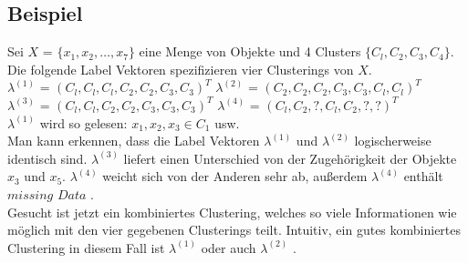\documentclass[runningheads]{llncs}
\begin{document}
\subsection{Beispiel}
Sei $X$ = $\{x_1, x_2, \ldots, x_7\}$ eine Menge von Objekte und 4 Clusters $\{C_{l}, C_{2}, C_{3}, C_{4}\}$. Die folgende Label Vektoren spezifizieren  vier Clusterings von $X$.\\[4pt]
$\lambda^{(1)}$ = $(C_{l}, C_{l}, C_{l}, C_{2}, C_{2}, C_{3}, C_{3})^{T}$ \qquad		
$\lambda^{(2)}$ = $(C_{2}, C_{2}, C_{2}, C_{3}, C_{3}, C_{l}, C_{l})^{T}$ \\
$\lambda^{(3)}$ = $(C_{l}, C_{l}, C_{2}, C_{2}, C_{3}, C_{3}, C_{3})^{T}$	\qquad
$\lambda^{(4)}$ = $(C_{l}, C_{2}, ?, C_{l}, C_{2}, ?, ?)^{T}$ \\
$\lambda^{(1)}$ wird so gelesen: $x_1, x_2, x_3 \in C_{1}$ usw.\\
Man kann erkennen, dass die Label Vektoren $\lambda^{(1)}$ und $\lambda^{(2)}$ logischerweise identisch sind. $\lambda^{(3)}$ liefert einen Unterschied von der Zugehörigkeit der Objekte $x_3$ und $x_5$. $\lambda^{(4)}$ weicht sich von der Anderen sehr ab, außerdem $\lambda^{(4)}$ enthält $missing$ $Data$ \cite{strehl2002cluster}.\\
Gesucht ist jetzt ein kombiniertes Clustering, welches so viele Informationen wie möglich mit den vier gegebenen Clusterings teilt. Intuitiv, ein gutes kombiniertes Clustering in diesem Fall ist  $\lambda^{(1)}$ oder auch $\lambda^{(2)}$ .
\end{document}
